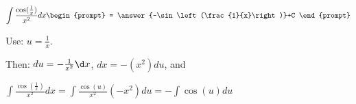 \documentclass{ximera}
\author{Steven Gubkin\and Nela Lakos}
\begin{document}
\begin{exercise}

\[
\int \frac{\cos(\frac{1}{x})}{x^2} dx \begin{prompt} = \answer{-\sin\left(\frac{1}{x}\right)}+C \end{prompt}
\]
\begin{hint}
Use: $u=\frac{1}{x}$.

\end{hint}
\begin{hint}
Then: $du=-\frac{1}{x^2}\d x$,  $dx=-(x^2) du$, and 

$\int \frac{\cos(\frac{1}{x})}{x^2} dx=\int \frac{\cos(u)}{x^2}(-x^2) du=-\int \cos(u) du$

\end{hint}
\end{exercise}
\end{document}
